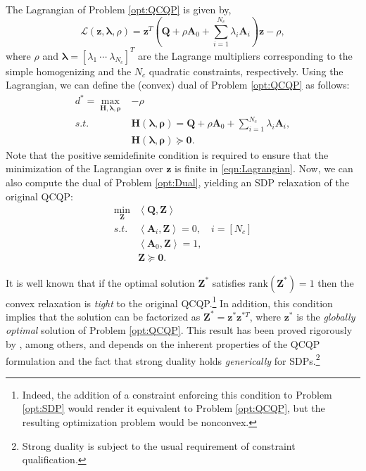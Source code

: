 \documentclass[lettersize,journal]{IEEEtran}
\newcommand{\inner}[2]{\left<#1,#2\right>}
\newcommand{\rank}[1]{\mbox{rank}\left(#1\right)}
\newcommand{\rev}[1]{\color{red}{#1}\color{black}}
\begin{document}
The Lagrangian of Problem \eqref{opt:QCQP} is given by,
\begin{equation}\label{eqn:Lagrangian}
	\mathcal{L}(\bm{z},\bm{\lambda}, \rho) = \bm{z}^T\left(\bm{Q} + \rho\bm{A}_0 +\sum\limits_{i=1}^{N_c} \lambda_i \bm{A}_i\right) \bm{z} - \rho,
\end{equation}
where $ \rho $ and $ \bm{\lambda} = \left[\lambda_1~\cdots~\lambda_{N_c}\right]^T $ are the Lagrange multipliers corresponding to the simple homogenizing and the $N_c$ quadratic constraints, respectively.
Using the Lagrangian, we can define the (convex) dual of Problem \eqref{opt:QCQP} as follows:
\begin{equation}\label{opt:Dual}
	\begin{array}{rl}
		d^*=\max\limits_{\bm{H},\bm{\lambda},\bm{\rho}} &-\rho \\ 
		s.t. & \bm{H}(\bm{\lambda},\bm{\rho}) = \bm{Q} + \rho\bm{A}_0 +\sum\limits_{i=1}^{N_c} \lambda_i \bm{A}_i, \\
		& \bm{H}(\bm{\lambda},\bm{\rho}) \succeq \bm{0}.
	\end{array}
\end{equation}
Note that the positive semidefinite condition is required to ensure that the minimization of the Lagrangian over $ \bm{z} $ is finite in \eqref{eqn:Lagrangian}. Now, we can also compute the dual of Problem \eqref{opt:Dual}, yielding an SDP relaxation of the original QCQP:
\begin{equation}\label{opt:SDP}
	\begin{array}{rl}
		\min\limits_{\bm{Z}} & \inner{\bm{Q}}{\bm{Z}}\\
		s.t.&\inner{\bm{A}_i}{\bm{Z}}= 0, \quad i = \left[N_c\right]\\
		& \inner{\bm{A}_0}{\bm{Z}}= 1, \\
		& \bm{Z} \succeq \bm{0}.
	\end{array}
\end{equation}

\rev{\subsection{Relaxation Tightness}}
It is well known that if the optimal solution $ \bm{Z}^* $ satisfies $ \rank{\bm{Z}^*}=1 $ then the convex relaxation is \textit{tight} to the original QCQP.\footnote{Indeed, the addition of a constraint enforcing this condition to Problem \eqref{opt:SDP} would render it equivalent to Problem \eqref{opt:QCQP}, but the resulting optimization problem would be nonconvex.} In addition, this condition implies that the solution can be factorized as $ \bm{Z}^* = \bm{z}^* \bm{z}^{*T} $, where $ \bm{z}^* $ is the \textit{globally optimal} solution of Problem \eqref{opt:QCQP}. This result has been proved rigorously by \cite{cifuentesLocalStabilitySemidefinite2022}, among others, and depends on the inherent properties of the QCQP formulation and the fact that strong duality holds \emph{generically} for SDPs.\footnote{Strong duality is subject to the usual requirement of constraint qualification. \rev{In our case, we ensure that the SDPs that we solve satisfy the Linear Independent Constraint Qualification.}}
\end{document}
